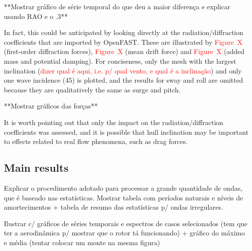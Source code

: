 **Mostrar gráfico de série temporal do que deu a maior diferença e explicar usando RAO e o .3**

In fact, this could be anticipated by looking directly at the radiation/diffraction coefficients that are imported by OpenFAST. These are illustrated by \textcolor{red}{Figure~X} (first-order diffraction forces), \textcolor{red}{Figure~X} (mean drift force) and \textcolor{red}{Figure~X} (added mass and potential damping). For conciseness, only the mesh with the largest inclination (\textcolor{red}{dizer qual é aqui, i.e. p/ qual vento, e qual é a inclinação}) and only one wave incidence (45\textdegree{}) is plotted, and the results for sway and roll are omitted because they are qualitatively the same as surge and pitch.

**Mostrar gráficos das forças**

It is worth pointing out that only the impact on the radiation/diffraction coefficients was assessed, and it is possible that hull inclination may be important to effects related to real flow phenomena, such as drag forces.


\subsection{Main results} \label{subsec:exp_vs_num:main_results}
Explicar o procedimento adotado para processar a grande quantidade de ondas, que é baseado nas estatísticas.
Mostrar tabela com períodos naturais e níveis de amortecimentos + tabela de resumo das estatísticas p/ ondas irregulares.

Ilustrar c/ gráficos de séries temporais e espectros de casos selecionados (tem que ter a aerodinâmica p/ mostrar que o rotor tá funcionando) + gráfico do máximo e média (tentar colocar um monte na mesma figura)


